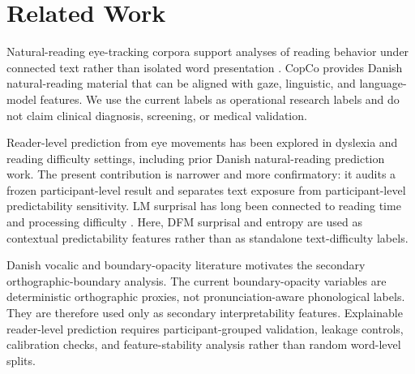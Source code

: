 \section{Related Work}
Natural-reading eye-tracking corpora support analyses of reading behavior under
connected text rather than isolated word presentation
\cite{kennedy2003d,kliegl2006tracking}. CopCo provides Danish natural-reading
material that can be aligned with gaze, linguistic, and language-model features. We use
the current labels as operational research labels and do not claim clinical diagnosis,
screening, or medical validation.

Reader-level prediction from eye movements has been explored in dyslexia and reading
difficulty settings, including prior Danish natural-reading prediction work. The
present contribution is narrower and more confirmatory: it audits a frozen
participant-level result and separates text exposure from participant-level
predictability sensitivity. LM surprisal has long been connected to reading time and
processing difficulty \cite{hale2001probabilistic,levy2008expectation,smith2013effect}.
Here, DFM surprisal and entropy are used as contextual predictability features rather
than as standalone text-difficulty labels.

Danish vocalic and boundary-opacity literature motivates the secondary
orthographic-boundary analysis. The current boundary-opacity variables are deterministic
orthographic proxies, not pronunciation-aware phonological labels. They are therefore
used only as secondary interpretability features. Explainable reader-level prediction
requires participant-grouped validation, leakage controls, calibration checks, and
feature-stability analysis rather than random word-level splits.
